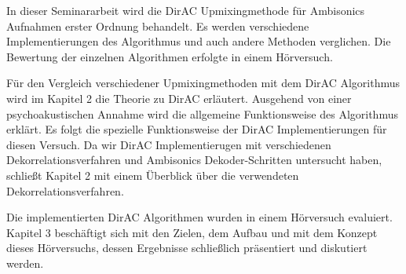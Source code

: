 In dieser Seminararbeit wird die DirAC Upmixingmethode für Ambisonics Aufnahmen erster Ordnung behandelt.
Es werden verschiedene Implementierungen des Algorithmus und auch andere Methoden verglichen.
Die Bewertung der einzelnen Algorithmen erfolgte in einem Hörversuch.

Für den Vergleich verschiedener Upmixingmethoden mit dem DirAC Algorithmus wird im Kapitel 2 die Theorie zu DirAC erläutert.
Ausgehend von einer psychoakustischen Annahme wird die allgemeine Funktionsweise des Algorithmus erklärt.
Es folgt die spezielle Funktionsweise der DirAC Implementierungen für diesen Versuch.
Da wir DirAC Implementierugen mit verschiedenen Dekorrelationsverfahren und Ambisonics Dekoder-Schritten untersucht haben, schließt Kapitel 2 mit einem Überblick über die verwendeten Dekorrelationsverfahren.

Die implementierten DirAC Algorithmen wurden in einem Hörversuch evaluiert.
Kapitel 3 beschäftigt sich mit den Zielen, dem Aufbau und mit dem Konzept dieses Hörversuchs, dessen Ergebnisse schließlich präsentiert und diskutiert werden.
